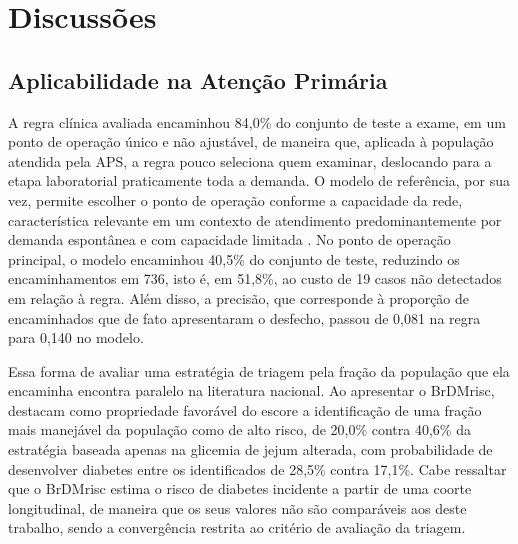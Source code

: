\chapter{Discussões}\label{cap:discussoes}

\section{Aplicabilidade na Atenção Primária}\label{sec:disc-aplicabilidade}
A regra clínica avaliada encaminhou 84,0\% do conjunto de teste a exame, em um ponto de operação único e não ajustável, de maneira que, aplicada à população atendida pela APS, a regra pouco seleciona quem examinar, deslocando para a etapa laboratorial praticamente toda a demanda. O modelo de referência, por sua vez, permite escolher o ponto de operação conforme a capacidade da rede, característica relevante em um contexto de atendimento predominantemente por demanda espontânea e com capacidade limitada \cite{geremia2020atenccao}. No ponto de operação principal, o modelo encaminhou 40,5\% do conjunto de teste, reduzindo os encaminhamentos em 736, isto é, em 51,8\%, ao custo de 19 casos não detectados em relação à regra. Além disso, a precisão, que corresponde à proporção de encaminhados que de fato apresentaram o desfecho, passou de 0,081 na regra para 0,140 no modelo.

Essa forma de avaliar uma estratégia de triagem pela fração da população que ela encaminha encontra paralelo na literatura nacional. Ao apresentar o BrDMrisc, \textcite{bracco2026brdmrisc} destacam como propriedade favorável do escore a identificação de uma fração mais manejável da população como de alto risco, de 20,0\% contra 40,6\% da estratégia baseada apenas na glicemia de jejum alterada, com probabilidade de desenvolver diabetes entre os identificados de 28,5\% contra 17,1\%. Cabe ressaltar que o BrDMrisc estima o risco de diabetes incidente a partir de uma coorte longitudinal, de maneira que os seus valores não são comparáveis aos deste trabalho, sendo a convergência restrita ao critério de avaliação da triagem.

